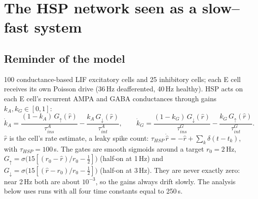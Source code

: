\documentclass[11pt]{article}
\newcommand{\kA}{k_A}
\newcommand{\kG}{k_G}
\begin{document}
\section{The HSP network seen as a slow--fast system}
\subsection{Reminder of the model}
100 conductance-based LIF excitatory cells and 25 inhibitory cells; each E cell receives its own Poisson drive
(36\,Hz deafferented, 40\,Hz healthy). HSP acts on each E cell's recurrent AMPA and GABA conductances through
gains $\kA,\kG\in[0,1]$:
\begin{equation}
\dot \kA = \frac{(1-\kA)\,G_\uparrow(\hat r)}{\tau^{A}_{ins}} - \frac{\kA\,G_\downarrow(\hat r)}{\tau^{A}_{int}},\qquad
\dot \kG = \frac{(1-\kG)\,G_\downarrow(\hat r)}{\tau^{G}_{ins}} - \frac{\kG\,G_\uparrow(\hat r)}{\tau^{G}_{int}}.
\label{eq:hsp}\end{equation}
$\hat r$ is the cell's rate estimate, a leaky spike count: $\tau_{HSP}\,\dot{\hat r} = -\hat r + \sum_k\delta(t-t_k)$, with
$\tau_{HSP} = 100$\,s. The gates are smooth sigmoids around a target $r_0 = 2$\,Hz,
$G_\uparrow = \sigma\big(15[(r_0-\hat r)/r_0 - \tfrac12]\big)$ (half-on at 1\,Hz) and
$G_\downarrow = \sigma\big(15[(\hat r-r_0)/r_0 - \tfrac12]\big)$ (half-on at 3\,Hz). They are never exactly zero: near
2\,Hz both are about $10^{-3}$, so the gains always drift slowly. The analysis below uses runs with all four time
constants equal to 250\,s.
\end{document}

